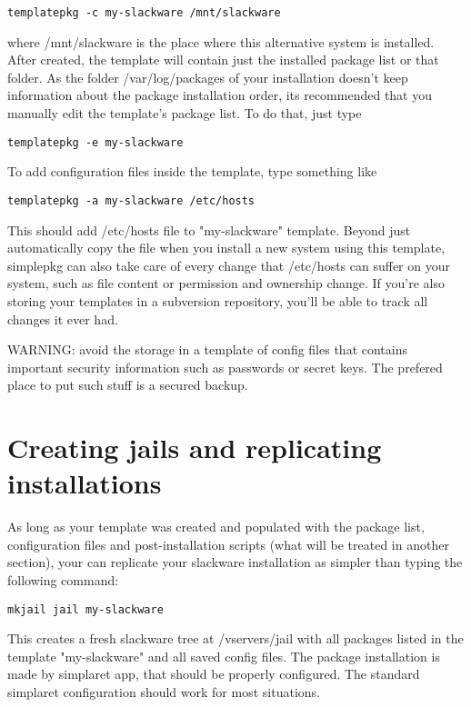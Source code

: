 \documentclass{article}
\begin{document}
\begin{verbatim}
templatepkg -c my-slackware /mnt/slackware
\end{verbatim}

where /mnt/slackware is the place where this alternative system is installed. After created, the template will contain just the installed package list or that folder. As the folder /var/log/packages of your installation doesn't keep information about the package installation order, its recommended that you manually edit the template's package list. To do that, just type

\begin{verbatim}
templatepkg -e my-slackware
\end{verbatim}

To add configuration files inside the template, type something like

\begin{verbatim}
templatepkg -a my-slackware /etc/hosts
\end{verbatim}

This should add /etc/hosts file to "my-slackware" template. Beyond just automatically copy the file when you install a new system using this template, simplepkg can also take care of every change that /etc/hosts can suffer on your system, such as file content or permission and ownership change. If you're also storing your templates in a subversion repository, you'll be able to track all changes it ever had.

WARNING: avoid the storage in a template of config files that contains important security information such as passwords or secret keys. The prefered place to put such stuff is a secured backup.

\section{Creating jails and replicating installations}

As long as your template was created and populated with the package list, configuration files and post-installation scripts (what will be treated in another section), your can replicate your slackware installation as simpler than typing the following command:

\begin{verbatim}
mkjail jail my-slackware
\end{verbatim}

This creates a fresh slackware tree at /vservers/jail with all packages listed in the template "my-slackware" and all saved config files. The package installation is made by simplaret app, that should be properly configured.  The standard simplaret configuration should work for most situations.
\end{document}
